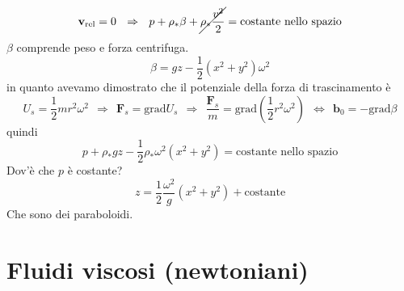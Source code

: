 \documentclass[10pt,a4paper,twoside]{book}
\begin{document}
\begin{equation*}
\mathbf{v}_{\text{rel}} =0\ \ \Rightarrow \ \ p+\rho _{*} \beta +\cancel{\rho _{*}\frac{v^{2}}{2}} =\text{costante nello spazio}
\end{equation*}
$\beta $ comprende peso e forza centrifuga.
\begin{equation*}
\beta =gz-\frac{1}{2}\left( x^{2} +y^{2}\right) \omega ^{2}
\end{equation*}
in quanto avevamo dimostrato che il potenziale della forza di trascinamento è
\begin{equation*}
U_{s} =\frac{1}{2} mr^{2} \omega ^{2} \ \ \Rightarrow \ \ \mathbf{F}_{s} =\mathrm{grad} U_{s} \ \ \Rightarrow \ \ \frac{\mathbf{F}_{s}}{m} =\mathrm{grad}\left(\frac{1}{2} r^{2} \omega ^{2}\right) \ \ \Leftrightarrow \ \ \mathbf{b}_{0} =-\mathrm{grad} \beta 
\end{equation*}
quindi
\begin{equation*}
p+\rho _{*} gz-\frac{1}{2} \rho _{*} \omega ^{2}\left( x^{2} +y^{2}\right) =\text{costante nello spazio}
\end{equation*}
Dov'è che $p$ è costante?
\begin{equation*}
z=\frac{1}{2}\frac{\omega ^{2}}{g}\left( x^{2} +y^{2}\right) +\text{costante}
\end{equation*}
Che sono dei paraboloidi.
\section{Fluidi viscosi (newtoniani)}
\end{document}

